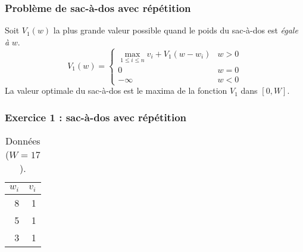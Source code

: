 \documentclass{beamer}
\begin{document}

\begin{frame}
  \frametitle{Problème de sac-à-dos avec répétition}
  Soit $V_1(w)$ la plus grande valeur possible quand le poids du sac-à-dos est \emph{égale à} $w$.
  \begin{equation*}
    V_1(w) =
    \begin{cases}
     \max_{1\leq i \leq n} v_i + V_1(w - w_i) & w > 0 \\
     0 & w = 0 \\
     - \infty & w < 0
    \end{cases}
  \end{equation*}
  La valeur optimale du sac-à-dos est le maxima de la fonction $V_1$ dans $[0, W]$.
\end{frame}
\begin{frame}
  \frametitle{Exercice 1 : sac-à-dos avec répétition}
  \begin{table}[h]
    \centering
    \begin{tabular}{r|r}
      \toprule
      $w_i$ & $v_i$ \\
      \midrule
      8 & 1\\
      5 & 1\\
      3 & 1\\
        \bottomrule
    \end{tabular}
    \caption{Données ($W=17$).}
  \end{table}
\end{frame}

\end{document}
